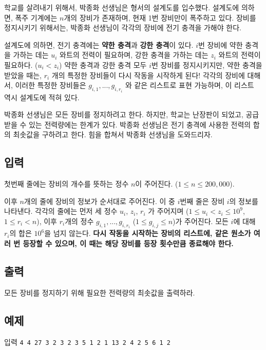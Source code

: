 \documentclass{article}
\begin{document}
학교를 살려내기 위해서, 박종화 선생님은 형서의 설계도를 입수했다. 설계도에 의하면, 폭주 기계에는 $n$개의 장비가 존재하며, 현재 1번 장비만이 폭주하고 있다. 장비를 정지시키기 위해서는, 박종화 선생님이 각각의 장비에 전기 충격을 가해야 한다. \newline

설계도에 의하면, 전기 충격에는 \textbf{약한 충격}과 \textbf{강한 충격}이 있다. $i$번 장비에 약한 충격을 가하는 데는 $u_i$ 와트의 전력이 필요하며, 강한 충격을 가하는 데는 $z_i$ 와트의 전력이 필요하다. ($u_i < z_i$) 약한 충격과 강한 충격 모두 $i$번 장비를 정지시키지만, 약한 충격을 받았을 때는, $r_i$ 개의 특정한 장비들이 다시 작동을 시작하게 된다! 각각의 장비에 대해서, 이러한 특정한 장비들은 $g_{i, 1}, ..., g_{i, r_i}$ 와 같은 리스트로 표현 가능하며, 이 리스트 역시 설계도에 적혀 있다. \newline

박종화 선생님은 모든 장비를 정지하려고 한다. 하지만, 학교는 난장판이 되었고, 공급받을 수 있는 전력량에는 한계가 있다. 박종화 선생님은 전기 충격에 사용한 전력의 합의 최솟값을 구하려고 한다. 힘을 합쳐서 박종화 선생님을 도와드리자. 

\subsection{입력}
첫번째 줄에는 장비의 개수를 뜻하는 정수 $n$이 주어진다. ($1 \leq n \leq 200,000$). \newline

이후 $n$개의 줄에 장비의 정보가 순서대로 주어진다. 이 중 $i$번째 줄은 장비 $i$의 정보를 나타낸다. 각각의 줄에는 먼저 세 정수 $u_i$, $z_i$, $r_i$ 가 주어지며 ($1 \leq u_i < z_i \leq 10^9$, $1 \leq r_i < n$), 이후 $r_i$개의 정수 $g_{i, 1}, ..., g_{i, r_i}$ ($1 \leq g_{i, j} \leq n$)가 주어진다. 모든 $i$에 대해 $r_i$의 합은 $10^6$을 넘지 않는다. \textbf{다시 작동을 시작하는 장비의 리스트에, 같은 원소가 여러 번 등장할 수 있으며, 이 때는 해당 장비를 등장 횟수만큼 종료해야 한다.}

\subsection{출력}
모든 장비를 정지하기 위해 필요한 전력량의 최솟값을 출력하라.

\subsection{예제}
입력
\bgroup\obeylines
\texttt{4
	4 27 3 2 3 2
	3 5 1 2
	1 13 2 4 2
	5 6 1 2\newline}
\egroup
\end{document}
